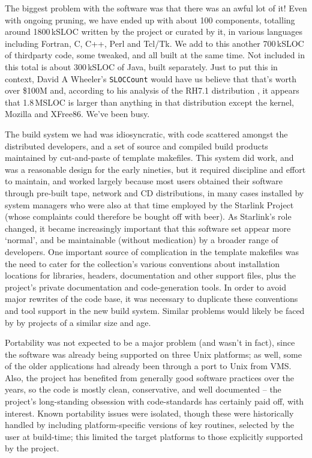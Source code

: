 \documentclass{speauth}
\begin{document}
The biggest problem with the software was that there was an awful lot
of it!  Even with ongoing pruning, we have ended up with about 100
components, totalling around 1800\,kSLOC written by the project or
curated by it, in various languages
including Fortran, C, C++, Perl and Tcl/Tk.  We add to this another
700\,kSLOC of thirdparty code, some tweaked, and all built at the same
time.  Not included in this total is about 300\,kSLOC of Java,
built separately.  Just to put this in context, David A
Wheeler's \texttt{SLOCCount} would have us believe that that's worth
over \$100M and, according to his analysis of the RH7.1 distribution
\cite{wheeler02}, it appears that 1.8\,MSLOC is larger than anything in
that distribution except the kernel, Mozilla and XFree86.  We've been busy.

The build system we had was idiosyncratic, with code scattered amongst
the distributed developers, and a set of source and compiled build
products maintained by cut-and-paste of template makefiles.  This
system did work, and was a reasonable design for the early nineties,
but it required discipline and effort to maintain, and worked largely
because most users obtained their software through pre-built tape, network and
CD distributions, in many cases installed by system managers who were
also at that time employed by the Starlink Project (whose complaints
could therefore be bought off with beer).  As Starlink's
role changed, it became increasingly important that this software set
appear more `normal', and be maintainable (without medication) by a
broader range of developers.  One important source of complication in the
template makefiles was the need to cater for the collection's various
conventions about installation locations for libraries, headers,
documentation and other support files, plus the project's private
documentation and code-generation tools.  In order to avoid major
rewrites of the code base, it was necessary to duplicate these
conventions and tool support in the new build system.  Similar
problems would likely be faced by by projects of a similar size and age.

Portability was not expected to be a major problem (and wasn't in
fact), since the software was already being supported on three Unix
platforms; as well, some of the older applications had already been
through a port to Unix from VMS.  Also, the project has benefited from
generally good software practices over the years, so the code is
mostly clean, conservative, and well documented -- the project's
long-standing obsession with code-standards has certainly paid off,
with interest.  Known portability issues were isolated, though these
were historically handled by including platform-specific versions of
key routines, selected by the user at build-time; this limited the
target platforms to those explicitly supported by the project.
\end{document}
